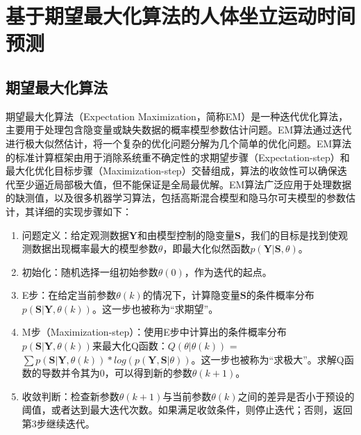\section{基于期望最大化算法的人体坐立运动时间预测}
\subsection{期望最大化算法}
期望最大化算法（Expectation Maximization，简称EM）是一种迭代优化算法，主要用于处理包含隐变量或缺失数据的概率模型参数估计问题。EM算法通过迭代进行极大似然估计，将一个复杂的优化问题分解为几个简单的优化问题。EM算法的标准计算框架由用于消除系统重不确定性的求期望步骤（Expectation-step）和最大化优化目标步骤（Maximization-step）交替组成，算法的收敛性可以确保迭代至少逼近局部极大值，但不能保证是全局最优解。EM算法广泛应用于处理数据的缺测值，以及很多机器学习算法，包括高斯混合模型和隐马尔可夫模型的参数估计，其详细的实现步骤如下：

\begin{enumerate}
\item 问题定义：给定观测数据$\mathbf{Y}$和由模型控制的隐变量$\mathbf{S}$，我们的目标是找到使观测数据出现概率最大的模型参数$θ$，即最大化似然函数$p(\mathbf{Y}|\mathbf{S}, θ)$。

\item 初始化：随机选择一组初始参数$θ(0)$，作为迭代的起点。

\item E步：在给定当前参数$θ(k)$的情况下，计算隐变量$\mathbf{S}$的条件概率分布$p(\mathbf{S}|\mathbf{Y}, θ(k))$。这一步也被称为“求期望”。

\item M步（Maximization-step）：使用E步中计算出的条件概率分布$p(\mathbf{S}|\mathbf{Y}, θ(k))$来最大化Q函数：$Q(θ|θ(k))$ = $\sum p(\mathbf{S}|\mathbf{Y}, θ(k)) * log(p(\mathbf{Y}, \mathbf{S}|θ))$。这一步也被称为``求极大''。求解Q函数的导数并令其为0，可以得到新的参数$θ(k+1)$。

\item 收敛判断：检查新参数$θ(k+1)$与当前参数$θ(k)$之间的差异是否小于预设的阈值，或者达到最大迭代次数。如果满足收敛条件，则停止迭代；否则，返回第3步继续迭代。
\end{enumerate}

